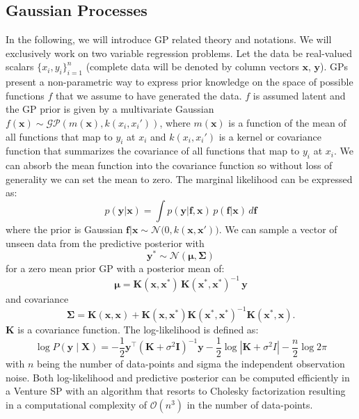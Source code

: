 \documentclass{article} %
\begin{document}
\subsection{Gaussian Processes}
In the following, we will introduce GP related theory and notations. We will exclusively work on two variable regression problems. Let the data be real-valued scalars  $\{x_i,y_i\}_{i=1}^n$ (complete data will be denoted by column vectors $\mathbf{x}$, $\mathbf{y}$). GPs present a non-parametric way to express prior knowledge on the space of possible functions  $f$ that we assume to have generated the data.  $f$ is assumed latent and the GP prior is given by a multivariate Gaussian $f(\mathbf{x})\sim \mathcal{GP}(m(\mathbf{x}),k(x_i,x_i'))$, where $m(\mathbf{x})$ is a function of the mean of all functions that map to $y_i$ at $x_i$ and $k(x_i,x_i')$ is a kernel or covariance function that summarizes the covariance of all functions that map to $y_i$ at $x_i$. We can absorb the mean function into the covariance function so without loss of generality we can set the mean to zero. The marginal likelihood can be expressed as:
\begin{equation}
\label{eq:marg}
p(\mathbf{y}|\mathbf{x}) = \int p(\mathbf{y}|\mathbf{f,x})\, p(\mathbf{f}|\mathbf{x}) \, d\mathbf{f} 
\end{equation}
where the prior is Gaussian $\mathbf{f}|\mathbf{x} \sim \mathcal{N}\big(0,k(\mathbf{x},\mathbf{x}')\big)$. We can sample a vector of unseen data from the predictive posterior with
\begin{equation}
\label{eq:gpsampler}
\mathbf{y}^* \sim \mathcal{N}(\bm{\mu},\bm{\Sigma}) 
\end{equation}
for a zero mean prior GP with a posterior mean of:
\begin{equation}
\label{eq:conditonalGaussianMean}
\bm{\mu} = \mathbf{K}(\mathbf{x},\mathbf{x}^*)\,\mathbf{K}(\mathbf{x}^*,\mathbf{x}^*)^{-1}\,\mathbf{y}
\end{equation}
and covariance
\begin{equation}
\label{eq:conditonalGaussianCovariance}
\bm{\Sigma} =  \mathbf{K}(\mathbf{x},\mathbf{x}) + \mathbf{K}(\mathbf{x},\mathbf{x}^*)\mathbf{K}(\mathbf{x}^*,\mathbf{x}^*)^{-1} \mathbf{K}(\mathbf{x}^*,\mathbf{x}).
\end{equation}
$\mathbf{K}$ is a covariance function. The log-likelihood is defined as:
\begin{equation}
\log P(\mathbf{y} \mid \mathbf{X})  = -\frac{1}{2}\mathbf{y}^\top (\mathbf{K} + \sigma^2\mathbf{I})^{-1}\mathbf{y} -  \frac{1}{2}\log |\mathbf{K} + \sigma^2I| -  \frac{n}{2}\log 2 \pi
\end{equation}
with $n$ being the number of data-points and sigma the independent observation noise.
Both log-likelihood and predictive posterior can be computed efficiently in a Venture SP with an algorithm that resorts to Cholesky factorization\citep[chap. 2]{rasmussen2006gaussian} resulting in a computational complexity of $\mathcal{O}(n^3)$ in the number of data-points.
\end{document}
